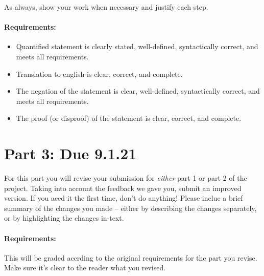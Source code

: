 \documentclass[12pt]{article}
\begin{document}
As always, show your work when necessary and justify each step.

\paragraph{Requirements:}
\begin{itemize}
  \item Quantified statement is clearly stated, well-defined, syntactically
    correct, and meets all requirements.
  \item Translation to english is clear, correct, and complete.
  \item The negation of the statement is clear, well-defined, syntactically
    correct, and meets all requirements.
  \item The proof (or disproof) of the statement is clear, correct, and
    complete.
\end{itemize}


\section*{Part 3: Due 9.1.21}

For this part you will revise your submission for \emph{either}
part 1 or part 2 of the project. Taking into account the feedback we gave you,
submit an improved version. If you aced it the first time, don't do anything! 
Please inclue a brief summary of the changes you made -- either by describing
the changes separately, or by highlighting the changes in-text.

\paragraph{Requirements:}
This will be graded accrding to the original requirements for the part you revise.
Make sure it's clear to the reader what you revised.
\end{document}
